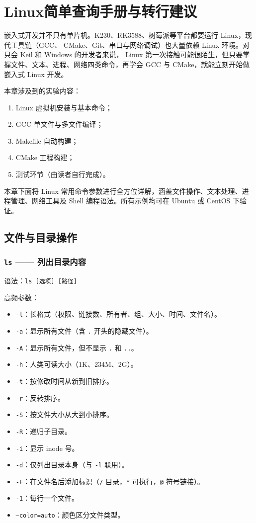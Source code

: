 \chapter{Linux简单查询手册与转行建议} \label{ch:linux}

嵌入式开发并不只有单片机。K230、RK3588、树莓派等平台都要运行 Linux，现代工具链（GCC、 CMake、Git、串口与网络调试）也大量依赖 Linux 环境。对只会 Keil 和 Windows 的开发者来说， Linux 第一次接触可能很陌生，但只要掌握文件、文本、进程、网络四类命令，再学会 GCC 与 CMake，就能立刻开始做嵌入式 Linux 开发。

\medskip 本章涉及到的实验内容：
\begin{enumerate}
\item Linux 虚拟机安装与基本命令；
\item GCC 单文件与多文件编译；
\item Makefile 自动构建；
\item CMake 工程构建；
\item 测试环节（由读者自行完成）。
\end{enumerate}

本章下面将 Linux 常用命令参数进行全方位详解，涵盖文件操作、文本处理、进程管理、网络工具及 Shell 编程语法。所有示例均可在 Ubuntu 或 CentOS 下验证。

\section{文件与目录操作}

\subsection*{\texttt{ls} —— 列出目录内容} 语法：\texttt{ls [选项] [路径]}

高频参数：
\begin{itemize}
\item \texttt{-l}：长格式（权限、链接数、所有者、组、大小、时间、文件名）。
\item \texttt{-a}：显示所有文件（含 \texttt{.} 开头的隐藏文件）。
\item \texttt{-A}：显示所有文件，但不显示 \texttt{.} 和 \texttt{..}。
\item \texttt{-h}：人类可读大小（1K、234M、2G）。
\item \texttt{-t}：按修改时间从新到旧排序。
\item \texttt{-r}：反转排序。
\item \texttt{-S}：按文件大小从大到小排序。
\item \texttt{-R}：递归子目录。
\item \texttt{-i}：显示 inode 号。
\item \texttt{-d}：仅列出目录本身（与 \texttt{-l} 联用）。
\item \texttt{-F}：在文件名后添加标识（\texttt{/} 目录，\texttt{*} 可执行，\texttt{@} 符号链接）。
\item \texttt{-1}：每行一个文件。
\item \texttt{--color=auto}：颜色区分文件类型。
\end{itemize}

